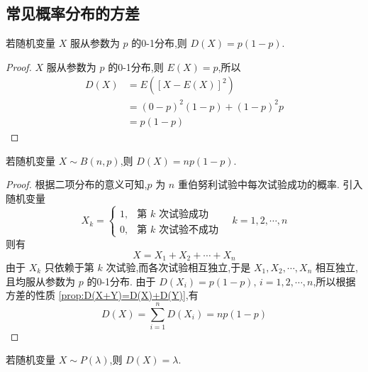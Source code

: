 \subsection{常见概率分布的方差}

\begin{conclusion}
    \indent 若随机变量 $X$ 服从参数为 $p$ 的0-1分布,则 $D(X) = p(1-p)$.
\end{conclusion}

\begin{proof}
    $X$ 服从参数为 $p$ 的0-1分布,则 $E(X)=p$,所以
    $$
    \begin{aligned}
        D(X) &= E([X-E(X)]^2) \\
        &= (0-p)^2 (1-p) + (1-p)^2 p \\
        &= p(1-p)
    \end{aligned}
    $$

    \vspace{-1.3em}
\end{proof}

\begin{conclusion}
    \indent 若随机变量 $X \sim B(n,p)$,则 $D(X) = np(1-p)$.
\end{conclusion}

\begin{proof}
    根据二项分布的意义可知,$p$ 为 $n$ 重伯努利试验中每次试验成功的概率. 引入随机变量
    $$
    X_k = \begin{cases}
        1, & \text{第 $k$ 次试验成功} \\
        0, & \text{第 $k$ 次试验不成功}
    \end{cases} \quad k=1,2,\cdots,n
    $$
    则有
    $$
    X = X_1 + X_2 + \cdots + X_n
    $$
    由于 $X_k$ 只依赖于第 $k$ 次试验,而各次试验相互独立,于是 $X_1, X_2, \cdots, X_n$ 相互独立,且均服从参数为 $p$ 的0-1分布. 由于 $D(X_i) = p(1-p), \, i=1,2,\cdots,n$,所以根据方差的性质 \ref{prop:D(X+Y)=D(X)+D(Y)},有
    $$
    D(X) = \sum_{i=1}^n D(X_i) = np(1-p)
    $$
\end{proof}

\begin{conclusion}
    \indent 若随机变量 $X \sim P(\lambda)$,则 $D(X) = \lambda$.
\end{conclusion}

